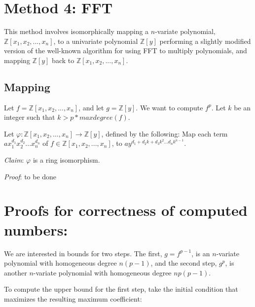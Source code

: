 \documentclass{article}
\begin{document}
\section*{Method 4: FFT}
This method involves isomorphically mapping a $n$-variate polynomial, $\mathbb{Z}[x_1, x_2, ... , x_n]$, to a univariate polynomial $\mathbb{Z}[y]$ performing a slightly modified version of the well-known algorithm for using FFT to multiply polynomials, and mapping $\mathbb{Z}[y]$ back to $\mathbb{Z}[x_1, x_2, ... , x_n]$.

\subsection*{Mapping}
Let $f = \mathbb{Z}[x_1, x_2, ... , x_n]$, and let $g = \mathbb{Z}[y]$. We want to compute $f^p$. Let $k$ be an integer such that $k > p * maxdegree(f)$.

Let $\varphi: \mathbb{Z}[x_1, x_2, ... , x_n] \rightarrow \mathbb{Z}[y]$, defined by the following:
Map each term $ax_{1}^{d_1}x_{2}^{d_2}...x_{n}^{d_n}$ of $f \in \mathbb{Z}[x_1, x_2, ... , x_n]$, to $ay^{d_1+d_2k+d_3k^2...d_nk^{n-1}}$.

\textit{Claim}: $\varphi$ is a ring isomorphism.

\textit{Proof}: to be done



\section*{Proofs for correctness of computed numbers:}
We are interested in bounds for two steps. The first, $g = f^{p - 1}$, is an $n$-variate polynomial with homogeneous degree $n(p - 1)$, and the second step, $g ^ p$, is another $n$-variate polynomial with homogeneous degree $np(p - 1)$.

To compute the upper bound for the first step, take the initial condition that maximizes the resulting maximum coefficient:
\end{document}
